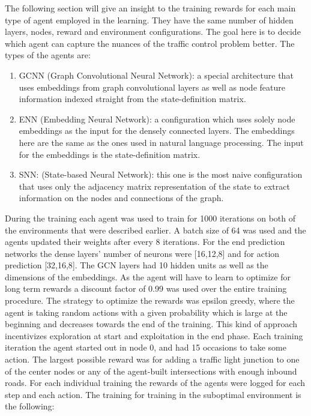 \documentclass[
]{elteikthesis}[2023/04/10]
\begin{document}
The following section will give an insight to the training rewards
for each main type of agent employed in the learning. They have the
same number of hidden layers, nodes, reward and environment configurations.
The goal here is to decide which agent can capture the nuances of
the traffic control problem better. The types of the agents are:
\begin{enumerate}
\item GCNN (Graph Convolutional Neural Network): a special architecture
that uses embeddings from graph convolutional layers as well as node
feature information indexed straight from the state-definition matrix. 
\item ENN (Embedding Neural Network): a configuration which uses solely node
embeddings as the input for the densely connected layers. The embeddings
here are the same as the ones used in natural language processing.
The input for the embeddings is the state-definition matrix. 
\item SNN: (State-based Neural Network): this one is the most naive configuration
that uses only the adjacency matrix representation of the state to
extract information on the nodes and connections of the graph. 
\end{enumerate}
During the training each agent was used to train for 1000 iterations
on both of the environments that were described earlier. A batch size
of 64 was used and the agents updated their weights after every 8
iterations. For the end prediction networks the dense layers' number
of neurons were {[}16,12,8{]} and for action prediction {[}32,16,8{]}.
The GCN layers had 10 hidden units as well as the dimensions of the
embeddings. As the agent will have to learn to optimize for long term
rewards a discount factor of 0.99 was used over the entire training procedure.
The strategy to optimize the rewards was epsilon greedy, where the
agent is taking random actions with a given probability which is large
at the beginning and decreases towards the end of the training. This
kind of approach incentivizes exploration at start and exploitation
in the end phase. Each training iteration the agent started out in
node 0, and had 15 occasions to take some action. The largest possible
reward was for adding a traffic light junction to one of the center
nodes or any of the agent-built intersections with enough inbound
roads. For each individual training the rewards of the agents were
logged for each step and each action. The training for training in
the suboptimal environment is the following: 
\end{document}
